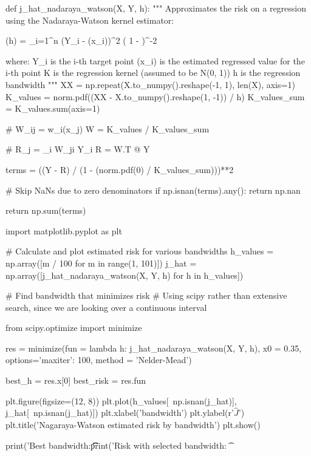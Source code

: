 \begin{python}
def j_hat_nadaraya_watson(X, Y, h):
    """
    Approximates the risk on a regression using the Nadaraya-Watson kernel estimator:
    
      (h) = \sum_{i=1}^n (Y_i - (x_i))^2 ( 1 -  )^{-2}
      
    where:
      Y_i is the i-th target point
      (x_i) is the estimated regressed value for the i-th point
      K is the regression kernel (assumed to be N(0, 1))
      h is the regression bandwidth
    """
    XX = np.repeat(X.to_numpy().reshape(-1, 1), len(X), axis=1)
    K_values = norm.pdf((XX - X.to_numpy().reshape(1, -1)) / h)
    K_values_sum = K_values.sum(axis=1)
    
    # W_ij = w_i(x_j)
    W = K_values / K_values_sum
    
    # R_j = \sum_i W_ji Y_i 
    R = W.T @ Y
    
    terms = ((Y - R) / (1 - (norm.pdf(0) / K_values_sum)))**2
    
    # Skip NaNs due to zero denominators
    if np.isnan(terms).any():
        return np.nan
    
    return np.sum(terms)
\end{python}

\begin{python}
import matplotlib.pyplot as plt

# Calculate and plot estimated risk for various bandwidths
h_values = np.array([m / 100 for m in range(1, 101)])
j_hat = np.array([j_hat_nadaraya_watson(X, Y, h) for h in h_values])
\end{python}

\begin{python}
# Find bandwidth that minimizes risk
# Using scipy rather than extensive search, since we are looking over a continuous interval

from scipy.optimize import minimize

res = minimize(fun = lambda h: j_hat_nadaraya_watson(X, Y, h), x0 = 0.35, options={'maxiter': 100}, method = 'Nelder-Mead')

best_h = res.x[0]
best_risk = res.fun
\end{python}

\begin{python}
plt.figure(figsize=(12, 8))
plt.plot(h_values[~np.isnan(j_hat)], j_hat[~np.isnan(j_hat)])
plt.xlabel('bandwidth')
plt.ylabel(r'$\hat{J}$')
plt.title('Nagaraya-Watson estimated risk by bandwidth')
plt.show()

print('Best bandwidth:\t\t\t%
print('Risk with selected bandwidth: \t%
\end{python}

